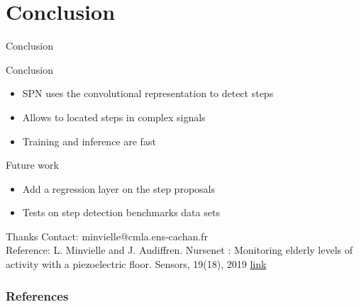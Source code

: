 \documentclass[9pt,t,aspectratio=1610]{beamer}
\begin{document}
\section{Conclusion}

\begin{frame}{Conclusion}

\centering
\begin{minipage}[t]{0.8\linewidth}
Conclusion
\begin{itemize}
    \item SPN uses the convolutional representation to detect steps
    \item Allows to located steps in complex signals
    \item Training and inference are fast
\end{itemize}
Future work
\begin{itemize}
    \item Add a regression layer on the step proposals
    \item Tests on step detection benchmarks data sets
\end{itemize}
\end{minipage}

\vfill
\pause
\begin{block}{\centering Thanks}
\medskip
Contact: minvielle@cmla.ens-cachan.fr\\[5pt]
Reference: L. Minvielle and J. Audiffren. Nursenet : Monitoring elderly levels of activity with a
piezoelectric floor. Sensors, 19(18), 2019
\; \href{https://www.mdpi.com/1424-8220/19/18/3851}{{ link}}
\end{block}
\end{frame}

%

\begin{frame}[allowframebreaks]
        \frametitle{References}
        
        
\end{frame}
\end{document}
